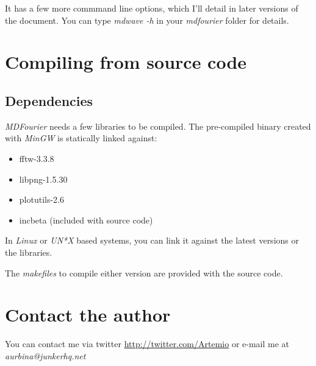 \documentclass[10pt,a4paper]{report}
\begin{document}
It has a few more commmand line options, which I'll detail in later versions of the document. You can type \textit{mdwave -h} in your \textit{mdfourier} folder for details.

\chapter{Compiling from source code}

\section{Dependencies}

\textit{MDFourier} needs a few libraries to be compiled. The pre-compiled binary created with \textit{MinGW}\cite{mingw} is statically linked against:

\begin{itemize}
	\item fftw-3.3.8\cite{fftw}
	\item libpng-1.5.30\cite{libpng}
	\item plotutils-2.6\cite{libplot}
	\item incbeta\cite{betafunction} (included with source code)
\end{itemize}

In \textit{Linux} or \textit{UN*X} based systems, you can link it against the latest versions or the libraries.

The \textit{makefiles} to compile either version are provided with the source code\cite{sourcecode}.

\chapter{Contact the author}
\label{contact}

You can contact me via twitter \url{http://twitter.com/Artemio} or e-mail me at \textit{aurbina@junkerhq.net}
\end{document}
